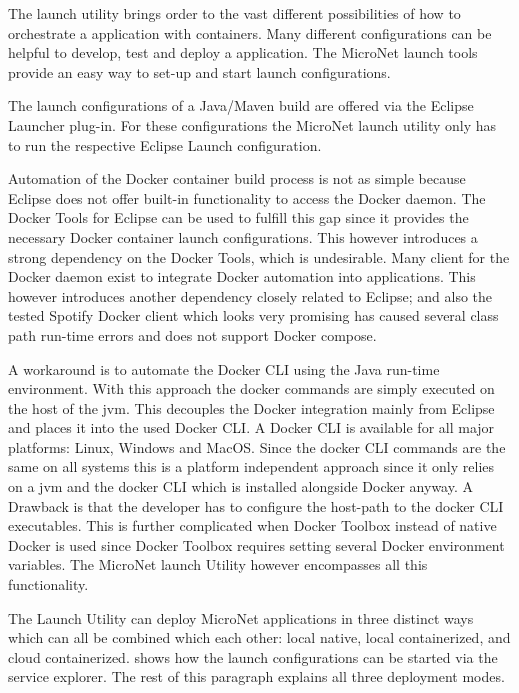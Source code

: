 The launch utility brings order to the vast different possibilities of how to
orchestrate a \ms{} application with containers. Many different configurations
can be helpful to develop, test and deploy a \ms{} application. The MicroNet
launch tools provide an easy way to set-up and start launch configurations.

The launch configurations of a Java/Maven build are offered via the Eclipse
Launcher plug-in. For these configurations the MicroNet launch utility only has
to run the respective Eclipse Launch configuration. 

Automation of the Docker container build process is not as simple because
Eclipse does not offer built-in functionality to access the Docker daemon.
The Docker Tools for Eclipse can be used to fulfill this gap since it provides
the necessary Docker container launch configurations. This however introduces a
strong dependency on the Docker Tools, which is undesirable. Many client for the
Docker daemon exist to integrate Docker automation into applications. This
however introduces another dependency closely related to Eclipse; and also the
tested Spotify Docker client which looks very promising has caused several class
path run-time errors and does not support Docker compose.

A workaround is to automate the Docker CLI using the Java run-time environment.
With this approach the docker commands are simply executed on the host of the
\gls{jvm}. This decouples the Docker integration mainly from Eclipse and places
it into the used Docker CLI. A Docker CLI is available for all major platforms:
Linux, Windows and MacOS. Since the docker CLI commands are the same on all
systems this is a platform independent approach since it only relies on a
\gls{jvm} and the docker CLI which is installed alongside Docker anyway. A
Drawback is that the developer has to configure the host-path to the docker CLI
executables. This is further complicated when Docker Toolbox instead of
native Docker is used since Docker Toolbox requires setting several Docker
environment variables. The MicroNet launch Utility however encompasses all this
functionality.

The Launch Utility can deploy MicroNet applications in three distinct ways which
can all be combined which each other: local native, local containerized, and
cloud containerized.  shows how the launch
configurations can be started via the service explorer. The rest of this
paragraph explains all three deployment modes.

